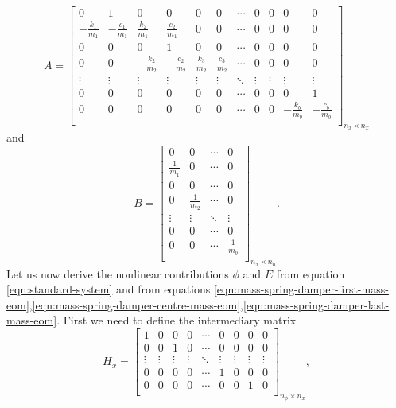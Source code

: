 \begin{equation}\label{eqn:msd-A}
    A =
    \begin{bmatrix}
        0 & 1 & 0 & 0 & 0 & 0 & \cdots & 0 & 0 & 0 & 0 \\
        -\frac{k_1}{m_1} & -\frac{c_1}{m_1} & \frac{k_2}{m_1} & \frac{c_2}{m_1} & 0 & 0 & \cdots & 0 & 0 & 0 & 0 \\
        0 & 0 & 0 & 1 & 0 & 0 & \cdots & 0 & 0 & 0 & 0 \\
       0 & 0 & -\frac{k_2}{m_2} & -\frac{c_2}{m_2} & \frac{k_3}{m_2} & \frac{c_3}{m_2} & \cdots & 0 & 0 & 0 & 0 \\
        \vdots & \vdots & \vdots & \vdots & \vdots & \vdots & \ddots & \vdots & \vdots & \vdots & \vdots \\
        0 & 0 & 0 & 0 & 0 & 0 & \cdots & 0 & 0 & 0 & 1 \\
        0 & 0 & 0 & 0 & 0 & 0 & \cdots & 0 & 0 & -\frac{k_b}{m_b} & -\frac{c_b}{m_b} \\
    \end{bmatrix}_{n_x \times n_x}
\end{equation}
and
\begin{equation}\label{eqn:msd-B}
    B = 
    \begin{bmatrix}
        0 & 0 & \cdots & 0 \\
        \frac{1}{m_1} & 0 & \cdots & 0 \\
        0 & 0 & \cdots & 0 \\
        0 & \frac{1}{m_2} & \cdots & 0 \\
        \vdots & \vdots & \ddots & \vdots \\
        0 & 0 & \cdots & 0 \\
        0 & 0 & \cdots & \frac{1}{m_b} \\
    \end{bmatrix}_{n_x \times n_u}.
\end{equation}
Let us now derive the nonlinear contributions $\phi$ and $E$ from equation \eqref{eqn:standard-system} and from equations \eqref{eqn:mass-spring-damper-first-mass-eom},\eqref{eqn:mass-spring-damper-centre-mass-eom},\eqref{eqn:mass-spring-damper-last-mass-eom}. First we need to define the intermediary matrix
\begin{equation}\label{eqn:Hx}
    H_{x} =
    \begin{bmatrix}
        1 & 0 & 0 & 0 & \cdots & 0 & 0 & 0 & 0 \\
        0 & 0 & 1 & 0 & \cdots & 0 & 0 & 0 & 0 \\
        \vdots & \vdots & \vdots & \vdots & \ddots & \vdots & \vdots & \vdots & \vdots \\
        0 & 0 & 0 & 0 & \cdots & 1 & 0 & 0 & 0 \\
        0 & 0 & 0 & 0 & \cdots & 0 & 0 & 1 & 0 \\
    \end{bmatrix}_{n_{\phi} \times n_{x}},
\end{equation}
